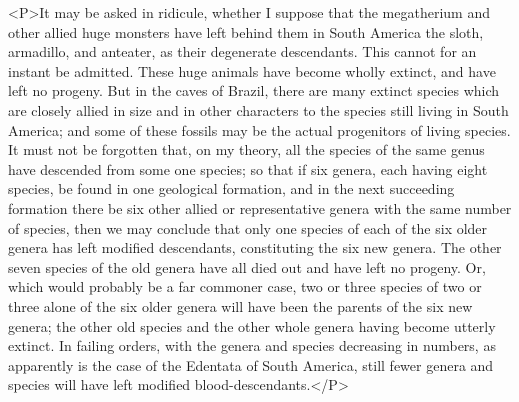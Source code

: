 <P>It may be asked in ridicule, whether I suppose that the megatherium and other allied huge monsters have left behind them in South America the sloth, armadillo, and anteater, as their degenerate descendants. This cannot for an instant be admitted. These huge animals have become wholly extinct, and have left no progeny. But in the caves of Brazil, there are many extinct species which are closely allied in size and in other characters to the species still living in South America; and some of these fossils may be the actual progenitors of living species. It must not be forgotten that, on my theory, all the species of the same genus have descended from some one species; so that if six genera, each having eight species, be found in one geological formation, and in the next succeeding formation there be six other allied or representative genera with the same number of species, then we may conclude that only one species of each of the six older genera has left modified descendants, constituting the six new genera. The other seven species of the old genera have all died out and have left no progeny.  Or, which would probably be a far commoner case, two or three species of two or three alone of the six older genera will have been the parents of the six new genera; the other old species and the other whole genera having become utterly extinct. In failing orders, with the genera and species decreasing in numbers, as apparently is the case of the Edentata of South America, still fewer genera and species will have left modified blood-descendants.</P>

